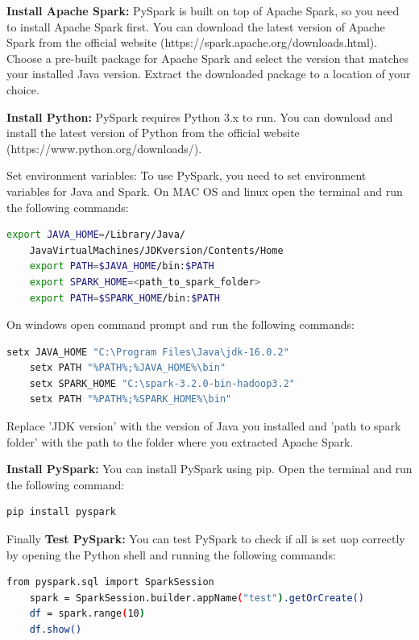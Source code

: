 \documentclass[]{final_report}
\begin{document}
\textbf{Install Apache Spark:} PySpark is built on top of Apache Spark, so you need to install Apache Spark first. You can download the latest version of Apache Spark from the official website (https://spark.apache.org/downloads.html). Choose a pre-built package for Apache Spark and select the version that matches your installed Java version. Extract the downloaded package to a location of your choice.

\textbf{Install Python:} PySpark requires Python 3.x to run. You can download and install the latest version of Python from the official website (https://www.python.org/downloads/).

Set environment variables: To use PySpark, you need to set environment variables for Java and Spark. On MAC OS and linux open the terminal and run the following commands:

\begin{lstlisting}[language=bash]
    export JAVA_HOME=/Library/Java/
    JavaVirtualMachines/JDKversion/Contents/Home
    export PATH=$JAVA_HOME/bin:$PATH
    export SPARK_HOME=<path_to_spark_folder>
    export PATH=$SPARK_HOME/bin:$PATH
\end{lstlisting}

On windows open command prompt and run the following commands:
\begin{lstlisting}[language=bash]
    setx JAVA_HOME "C:\Program Files\Java\jdk-16.0.2"
    setx PATH "%PATH%;%JAVA_HOME%\bin"
    setx SPARK_HOME "C:\spark-3.2.0-bin-hadoop3.2"
    setx PATH "%PATH%;%SPARK_HOME%\bin"
\end{lstlisting}

Replace 'JDK version' with the version of Java you installed and 'path to spark folder' with the path to the folder where you extracted Apache Spark.

\textbf{Install PySpark:} You can install PySpark using pip. Open the terminal and run the following command:

\begin{lstlisting}[language=bash]
    pip install pyspark
\end{lstlisting}

Finally \textbf{Test PySpark:} You can test PySpark to check if all is set uop correctly by opening the Python shell and running the following commands:

\begin{lstlisting}[language=bash]
    from pyspark.sql import SparkSession
    spark = SparkSession.builder.appName("test").getOrCreate()
    df = spark.range(10)
    df.show()
\end{lstlisting}
\end{document}
